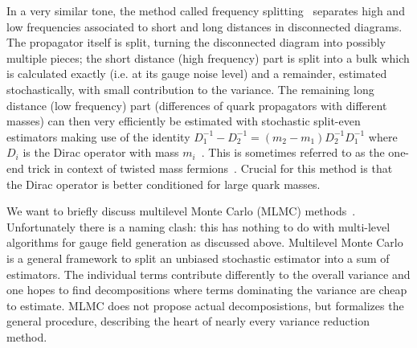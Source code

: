 In a very similar tone, the method called frequency splitting~\cite{Giusti:2019kff,Giusti:2020dtz} separates high and low frequencies associated to short and long distances in disconnected diagrams.
The propagator itself is split, turning the disconnected diagram into possibly multiple pieces; the short distance (high frequency) part is split into a bulk which is calculated exactly (i.e. at its gauge noise level) and a remainder, estimated stochastically, with small contribution to the variance.
The remaining long distance (low frequency) part (differences of quark propagators with different masses) can then very efficiently be estimated with stochastic split-even estimators making use of the identity $D_1^{-1} - D_2^{-1} = (m_2 - m_1) D_2^{-1} D_1^{-1}$ where $D_i$ is the Dirac operator with mass $m_i$~\cite{Whyte:2022vrk}.
This is sometimes referred to as the one-end trick in context of twisted mass fermions~\cite{ETM:2008zte,PhysRevD.73.074506,PhysRevD.59.074503}.
Crucial for this method is that the Dirac operator is better conditioned for large quark masses.


We want to briefly discuss multilevel Monte Carlo (MLMC) methods~\cite{giles2008,Giles_2015}.
Unfortunately there is a naming clash: this has nothing to do with multi-level algorithms for gauge field generation as discussed above.
Multilevel Monte Carlo is a general framework to split an unbiased stochastic estimator into a sum of estimators.
The individual terms contribute differently to the overall variance and one hopes to find decompositions where terms dominating the variance are cheap to estimate.
MLMC does not propose actual decomposistions, but formalizes the general procedure, describing the heart of nearly every variance reduction method.

